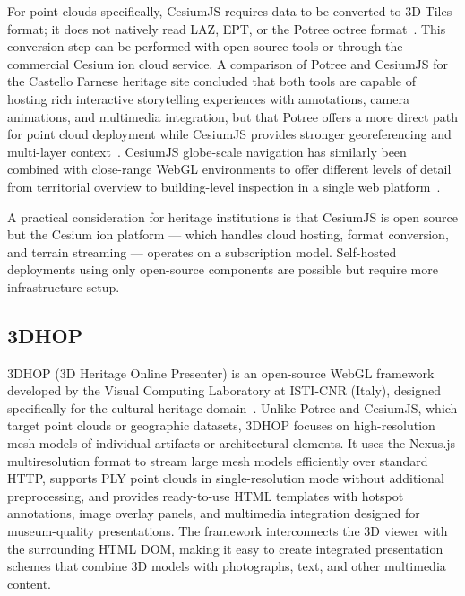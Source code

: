 \documentclass[]{report}
\begin{document}
For point clouds specifically, CesiumJS requires data to be converted to 3D Tiles format;
it does not natively read LAZ, EPT, or the Potree octree format~\cite{cesium_matom}. This
conversion step can be performed with open-source tools or through the commercial Cesium ion
cloud service. A comparison of Potree and CesiumJS for the Castello Farnese heritage site concluded that both tools are capable of hosting
rich interactive storytelling experiences with annotations, camera animations, and multimedia
integration, but that Potree offers a more direct path for point cloud deployment while
CesiumJS provides stronger georeferencing and multi-layer context~\cite{gaspari2023webgl}. CesiumJS globe-scale navigation has similarly been combined with
close-range WebGL environments to offer different levels of detail from territorial overview
to building-level inspection in a single web platform~\cite{laguardia2022webgl}.

A practical consideration for heritage institutions is that CesiumJS is open source but the
Cesium ion platform --- which handles cloud hosting, format conversion, and terrain streaming
--- operates on a subscription model. Self-hosted deployments using only open-source
components are possible but require more infrastructure setup.

\subsection{3DHOP}
\label{subsec:3dhop}

3DHOP (3D Heritage Online Presenter) is an open-source WebGL framework developed by the
Visual Computing Laboratory at ISTI-CNR (Italy), designed specifically for the cultural
heritage domain~\cite{potenziani20153dhop}. Unlike Potree and CesiumJS, which target point
clouds or geographic datasets, 3DHOP focuses on high-resolution mesh models of individual
artifacts or architectural elements. It uses the Nexus.js multiresolution format to stream
large mesh models efficiently over standard HTTP, supports PLY point clouds in single-resolution
mode without additional preprocessing, and provides ready-to-use HTML templates with hotspot
annotations, image overlay panels, and multimedia integration designed for museum-quality
presentations. The framework interconnects the 3D viewer with the surrounding HTML DOM,
making it easy to create integrated presentation schemes that combine 3D models with
photographs, text, and other multimedia content.
\end{document}
